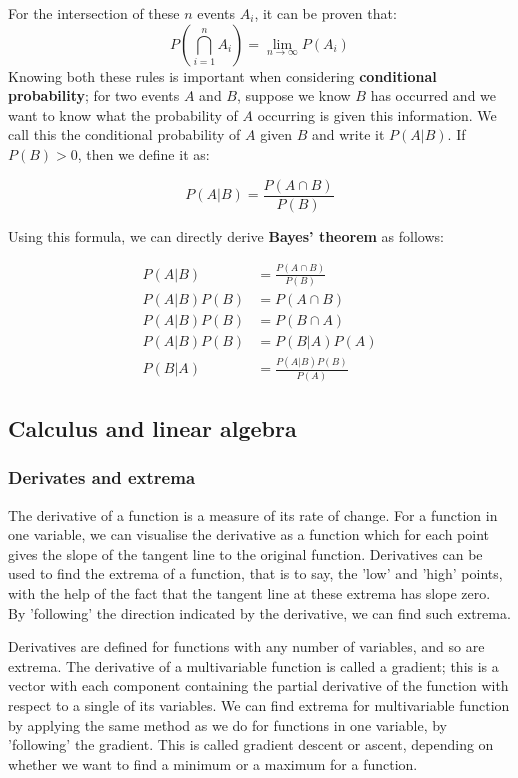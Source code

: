 For the intersection of these $n$ events $A_i$, it can be proven that:
\begin{equation}
  P(\bigcap_{i=1}^n A_i) = \lim_{n \to \infty} P(A_i)
\end{equation}
Knowing both these rules is important when considering
\textbf{conditional probability}; for two events $A$ and $B$, suppose
we know $B$ has occurred and we want to know what the probability of
$A$ occurring is given this information. We call this the conditional
probability of $A$ given $B$ and write it $P(A|B)$. If $P(B) > 0$,
then we define it as:

\begin{equation}
  P(A|B) = \frac{P(A \cap B)}{P(B)}
\end{equation}

Using this formula, we can directly derive \textbf{Bayes' theorem} as follows:

\begin{equation}
  \begin{aligned}
    P(A|B) &= \frac{P(A \cap B)}{P(B)} \\
    P(A|B) P(B) &= P(A \cap B)\\
    P(A|B) P(B) &= P(B \cap A)\\
    P(A|B) P(B) &= P(B|A) P(A)\\
    P(B|A) &= \frac{P(A|B) P(B)}{P(A)}
  \end{aligned}
\end{equation}

\subsection{Calculus and linear algebra}
\label{sec:calculus}

\subsubsection{Derivates and extrema}
The derivative of a function is a measure of its rate of change. For a
function in one variable, we can visualise the derivative as a
function which for each point gives the slope of the tangent line to
the original function. Derivatives can be used to find the extrema of
a function, that is to say, the 'low' and 'high' points, with the help
of the fact that the tangent line at these extrema has slope zero. By
'following' the direction indicated by the derivative, we can find
such extrema.

Derivatives are defined for functions with any number of variables,
and so are extrema. The derivative of a multivariable function is
called a gradient; this is a vector with each component containing the
partial derivative of the function with respect to a single of its
variables. We can find extrema for multivariable function by applying
the same method as we do for functions in one variable, by 'following'
the gradient. This is called gradient descent or ascent, depending on
whether we want to find a minimum or a maximum for a function.

